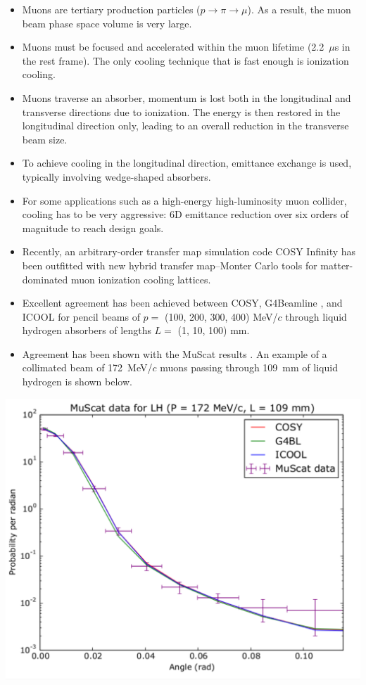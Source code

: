 \documentclass[portrait,a0paper,fontscale=0.285]{baposter} %
\begin{document}
\begin{poster}
{
\begin{itemize}
\item Muons are tertiary production particles ($ p \rightarrow \pi \rightarrow \mu $). As a result, the muon beam phase space volume is very large.
\item Muons must be focused and accelerated within the muon lifetime (2.2~$\mu$s in the rest frame). The only cooling technique that is fast enough is ionization cooling.
\item Muons traverse an absorber, momentum is lost both in the longitudinal and transverse directions due to ionization. The energy is then restored in the longitudinal direction only, leading to an overall reduction in the transverse beam size.
\item To achieve cooling in the longitudinal direction, emittance exchange is used, typically involving wedge-shaped absorbers.
\item For some applications such as a high-energy high-luminosity muon collider, cooling has to be very aggressive: 6D emittance reduction over six orders of magnitude to reach design goals.
\item Recently, an arbitrary-order transfer map simulation code COSY Infinity \cite{cosy} has been outfitted with new hybrid transfer map--Monter Carlo tools for matter-dominated muon ionization cooling lattices. \item Excellent agreement has been achieved between COSY, G4Beamline \cite{g4bl}, and ICOOL \cite{icool} for pencil beams of $p=$ (100, 200, 300, 400) MeV/$c$ through liquid hydrogen absorbers of lengths $L =$ (1, 10, 100) mm.
\item Agreement has been shown with the \mbox{MuScat} results \cite{muscat}. An example of a collimated beam of 172~MeV/$c$ muons passing through 109~mm of liquid hydrogen is shown below.
\end{itemize}
\begin{center}
\includegraphics[width=\textwidth]{Figures/Figure2poster}
\end{center}
}


\end{poster}
\end{document}
